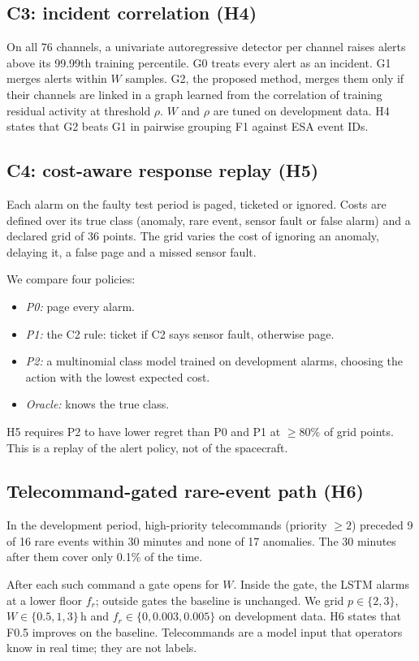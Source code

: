 \documentclass[conference]{IEEEtran}
\begin{document}
\subsection{C3: incident correlation (H4)}
On all 76 channels, a univariate autoregressive detector per channel raises alerts above its 99.99th training percentile. G0 treats every alert as an incident. G1 merges alerts within $W$ samples. G2, the proposed method, merges them only if their channels are linked in a graph learned from the correlation of training residual activity at threshold $\rho$. $W$ and $\rho$ are tuned on development data. H4 states that G2 beats G1 in pairwise grouping F1 against ESA event IDs.

\subsection{C4: cost-aware response replay (H5)}
Each alarm on the faulty test period is paged, ticketed or ignored. Costs are defined over its true class (anomaly, rare event, sensor fault or false alarm) and a declared grid of 36 points. The grid varies the cost of ignoring an anomaly, delaying it, a false page and a missed sensor fault.

We compare four policies:
\begin{itemize}
\item \emph{P0:} page every alarm.
\item \emph{P1:} the C2 rule: ticket if C2 says sensor fault, otherwise page.
\item \emph{P2:} a multinomial class model trained on development alarms, choosing the action with the lowest expected cost.
\item \emph{Oracle:} knows the true class.
\end{itemize}
H5 requires P2 to have lower regret than P0 and P1 at $\geq$80\% of grid points. This is a replay of the alert policy, not of the spacecraft.

\subsection{Telecommand-gated rare-event path (H6)}
In the development period, high-priority telecommands (priority $\geq 2$) preceded 9 of 16 rare events within 30 minutes and none of 17 anomalies. The 30 minutes after them cover only 0.1\% of the time.

After each such command a gate opens for $W$. Inside the gate, the LSTM alarms at a lower floor $f_r$; outside gates the baseline is unchanged. We grid $p \in \{2,3\}$, $W \in \{0.5, 1, 3\}$\,h and $f_r \in \{0, 0.003, 0.005\}$ on development data. H6 states that F0.5 improves on the baseline. Telecommands are a model input that operators know in real time; they are not labels.
\end{document}
